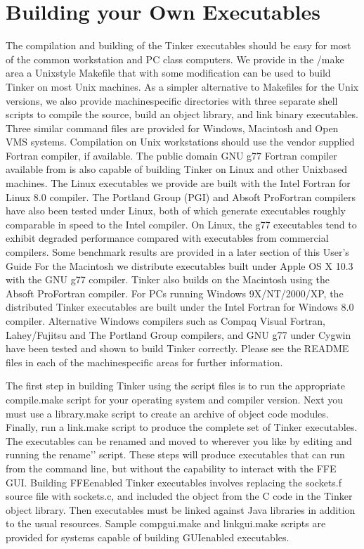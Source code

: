 \documentclass[letterpaper,11pt,english]{sphinxmanual}
\begin{document}
\section{Building your Own Executables}
\label{\detokenize{text/installation:building-your-own-executables}}
The compilation and building of the Tinker executables should be easy for most of the common workstation and PC class computers. We provide in the /make area a Unix\sphinxhyphen{}style Makefile that with some modification can be used to build Tinker on most Unix machines. As a simpler alternative to Makefiles for the Unix versions, we also provide machine\sphinxhyphen{}specific directories with three separate shell scripts to compile the source, build an object library, and link binary executables. Three similar command files are provided for Windows, Macintosh and Open VMS systems. Compilation on Unix workstations should use the vendor supplied Fortran compiler, if available. The public domain GNU g77 Fortran compiler available from  is also capable of building Tinker on Linux and other Unix\sphinxhyphen{}based machines. The Linux executables we provide are built with the Intel Fortran for Linux 8.0 compiler. The Portland Group (PGI) and Absoft ProFortran compilers have also been tested under Linux, both of which generate executables roughly comparable in speed to the Intel compiler. On Linux, the g77 executables tend to exhibit degraded performance compared with executables from commercial compilers. Some benchmark results are provided in a later section of this User’s Guide For the Macintosh we distribute executables built under Apple OS X 10.3 with the GNU g77 compiler. Tinker also builds on the Macintosh using the Absoft ProFortran compiler. For PCs running Windows 9X/NT/2000/XP, the distributed Tinker executables are built under the Intel Fortran for Windows 8.0 compiler. Alternative Windows compilers such as Compaq Visual Fortran, Lahey/Fujitsu and The Portland Group compilers, and GNU g77 under Cygwin have been tested and shown to build Tinker correctly. Please see the README files in each of the machine\sphinxhyphen{}specific areas for further information.

The first step in building Tinker using the script files is to run the appropriate compile.make script for your operating system and compiler version. Next you must use a library.make script to create an archive of object code modules. Finally, run a link.make script to produce the complete set of Tinker executables. The executables can be renamed and moved to wherever you like by editing and running the {\color{red}\bfseries{}\textasciigrave{}\textasciigrave{}}rename’’ script. These steps will produce executables that can run from the command line, but without the capability to interact with the FFE GUI. Building FFE\sphinxhyphen{}enabled Tinker executables involves replacing the sockets.f source file with sockets.c, and included the object from the C code in the Tinker object library. Then executables must be linked against Java libraries in addition to the usual resources. Sample compgui.make and linkgui.make scripts are provided for systems capable of building GUI\sphinxhyphen{}enabled executables.
\end{document}
